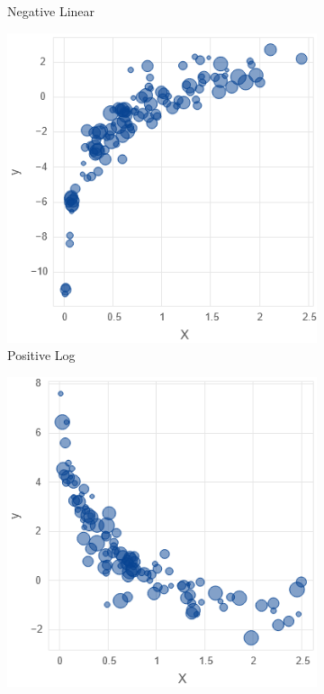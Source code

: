 \begin{figure}
\begin{subfigure}[b]{0.21\textwidth}
         \caption{Negative Linear}
         \label{figure: neg_lin}
     \end{subfigure}
     \hfill
     \begin{subfigure}[b]{0.21\textwidth}
         \includegraphics[width=\textwidth]{figures/body/methodology/log_pos_bubble.png}
         \caption{Positive Log}
         \label{figure: pos_log}
     \end{subfigure}
     \hfill
     \begin{subfigure}[b]{0.21\textwidth}
         \includegraphics[width=\textwidth]{figures/body/methodology/log_neg_bubble.png}

\end{subfigure}
\end{figure}
